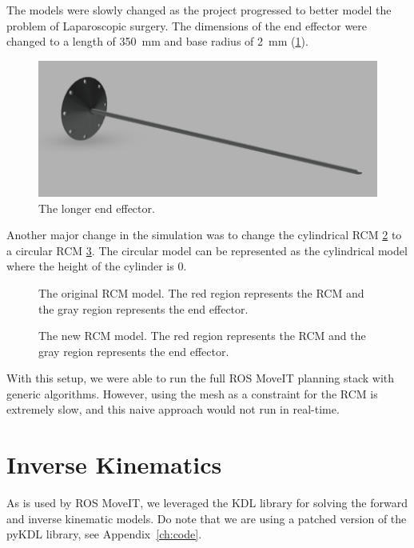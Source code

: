 \documentclass[BTech]{iitmdiss}
\begin{document}
    The models were slowly changed as the project progressed to better model the problem of Laparoscopic surgery.
    The dimensions of the end effector were changed to a length of \SI{350}{\milli\meter} and base radius of \SI{2}{\milli\meter} (\ref{fig:longer_ee}).

    \begin{figure}
        \centering
        \includegraphics[width=0.75 \linewidth]{./img/longer_end_effector}
        \caption{The longer end effector.}
        \label{fig:longer_ee}
    \end{figure}

    Another major change in the simulation was to change the cylindrical RCM \ref{fig:rcm_cylinder} to a circular RCM \ref{fig:rcm_circle}.
    The circular model can be represented as the cylindrical model where the height of the cylinder is 0.

    \begin{figure}
        \centering
        
        \caption{The original RCM model. The red region represents the RCM and the gray region represents the end effector.}
        \label{fig:rcm_cylinder}
    \end{figure}

    \begin{figure}
        \centering
        
        \caption{The new RCM model. The red region represents the RCM and the gray region represents the end effector.}
        \label{fig:rcm_circle}
    \end{figure}

    With this setup, we were able to run the full ROS MoveIT planning stack with generic algorithms.
    However, using the mesh as a constraint for the RCM is extremely slow, and this naive approach would not run in real-time.


    \section{Inverse Kinematics}

    As is used by ROS MoveIT, we leveraged the KDL library for solving the forward and inverse kinematic models.
    Do note that we are using a patched version of the pyKDL library, see Appendix~\ref{ch:code}.
\end{document}
